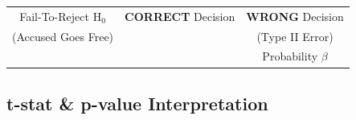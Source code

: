\documentclass[11pt, english]{article}
\begin{document}
\begin{table}[h]
\begin{center}
\begin{tabular}{p{4cm}p{4cm}p{4cm}}
                \hline
                \multicolumn{1}{c|}{Fail-To-Reject H$_0$} & \multicolumn{1}{c|}{\textbf{CORRECT} Decision} & \multicolumn{1}{c}{\textbf{WRONG} Decision}\\
                \multicolumn{1}{c|}{(Accused Goes Free)} & & \multicolumn{1}{|c}{(Type II Error)}\\
                & \multicolumn{1}{|c|}{} & \multicolumn{1}{c}{Probability $\beta$}\\
                \hline
        \end{tabular}
        \end{center}
        \end{table}

	\newpage

	\subsection{t-stat \& p-value Interpretation}
\end{document}
